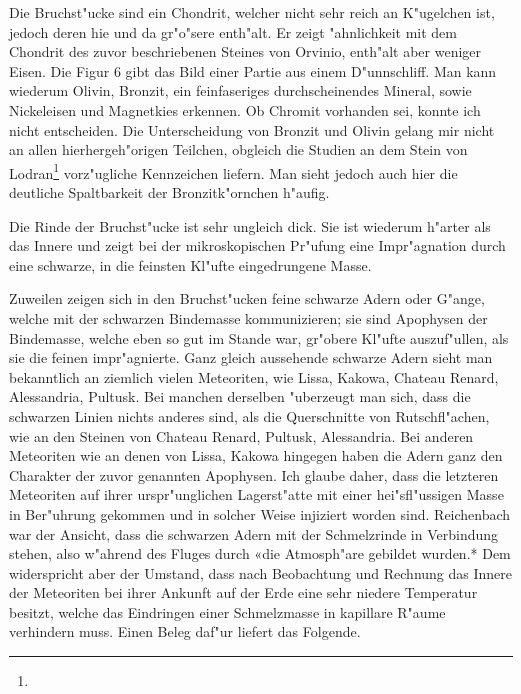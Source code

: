 \documentclass[a4paper, 11pt, oneside]{article}
\begin{document}
Die Bruchst"ucke sind ein Chondrit, welcher nicht sehr reich an K"ugelchen ist, jedoch deren hie und da gr"o"sere enth"alt. Er zeigt "ahnlichkeit mit dem Chondrit des zuvor beschriebenen Steines von Orvinio, enth"alt aber weniger Eisen. Die Figur 6 gibt das Bild einer Partie aus einem D"unnschliff. Man kann wiederum Olivin, Bronzit, ein feinfaseriges durchscheinendes Mineral, sowie Nickeleisen und Magnetkies erkennen. Ob Chromit vorhanden sei, konnte ich nicht entscheiden. Die Unterscheidung von Bronzit und Olivin gelang mir nicht an allen hierhergeh"origen Teilchen, obgleich die Studien an dem Stein von Lodran\footnote{} vorz"ugliche Kennzeichen liefern. Man sieht jedoch auch hier die deutliche Spaltbarkeit der Bronzitk"ornchen h"aufig.

Die Rinde der Bruchst"ucke ist sehr ungleich dick. Sie ist wiederum h"arter als das Innere und zeigt bei der mikroskopischen Pr"ufung eine Impr"agnation durch eine schwarze, in die feinsten Kl"ufte eingedrungene Masse.

Zuweilen zeigen sich in den Bruchst"ucken feine schwarze Adern oder G"ange, welche mit der schwarzen Bindemasse kommunizieren; sie sind Apophysen der Bindemasse, welche eben so gut im Stande war, gr"obere Kl"ufte auszuf"ullen, als sie die feinen impr"agnierte. Ganz gleich aussehende schwarze Adern sieht man bekanntlich an ziemlich vielen Meteoriten, wie Lissa, Kakowa, Chateau Renard, Alessandria, Pultusk. Bei manchen derselben "uberzeugt man sich, dass die schwarzen Linien nichts anderes sind, als die Querschnitte von Rutschfl"achen, wie an den Steinen von Chateau Renard, Pultusk, Alessandria. Bei anderen Meteoriten wie an denen von Lissa, Kakowa hingegen haben die Adern ganz den Charakter der zuvor genannten Apophysen. Ich glaube daher, dass die letzteren Meteoriten auf ihrer urspr"unglichen Lagerst"atte mit einer hei"sfl"ussigen Masse in Ber"uhrung gekommen und in solcher Weise injiziert worden sind. Reichenbach war der Ansicht, dass die schwarzen Adern mit der Schmelzrinde in Verbindung stehen, also w"ahrend des Fluges durch «die Atmosph"are gebildet wurden.* Dem widerspricht aber der Umstand, dass nach Beobachtung und Rechnung das Innere der Meteoriten bei ihrer Ankunft auf der Erde eine sehr niedere Temperatur besitzt, welche das Eindringen einer Schmelzmasse in kapillare R"aume verhindern muss. Einen Beleg daf"ur liefert das Folgende.
\end{document}

